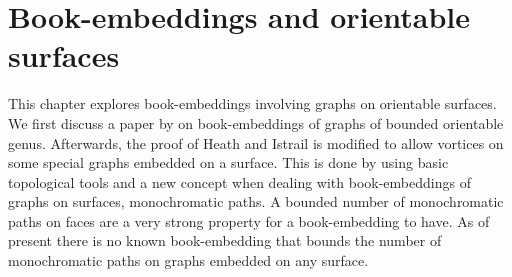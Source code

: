 \chapter{Book-embeddings and orientable surfaces}\label{chap:orientable}

This chapter explores book-embeddings involving graphs on orientable surfaces. We first discuss a paper by \textcite{heathPagenumberGenusGraphs1992} on book-embeddings of graphs of bounded orientable genus. Afterwards, the proof of Heath and Istrail is modified to allow vortices on some special graphs embedded on a surface. This is done by using basic topological tools and a new concept when dealing with book-embeddings of graphs on surfaces, monochromatic paths. A bounded number of monochromatic paths on faces are a very strong property for a book-embedding to have. As of present there is no known book-embedding that bounds the number of monochromatic paths on graphs embedded on any surface.



%
